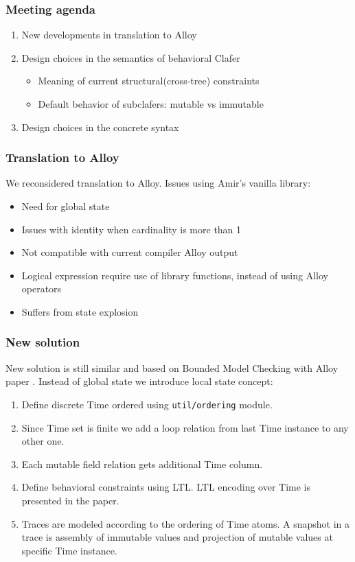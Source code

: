 \documentclass[xcolor=dvipsnames,12pt]{beamer}
\author{Paulius and Bogdan}
\date{May 29, 2013}
\newcommand\Fontvi{\fontsize{14}{14}\selectfont}
\begin{document}
  \begin{frame}
    \frametitle{Meeting agenda}
    \Fontvi
    \begin{enumerate}
      \item New developments in translation to Alloy
      \item Design choices in the semantics of behavioral Clafer
        \begin{itemize}
          \item Meaning of current structural(cross-tree) constraints
          \item Default behavior of subclafers: mutable vs immutable
        \end{itemize}
      \item{Design choices in the concrete syntax}
    \end{enumerate}
  \end{frame}

  \begin{frame}
    \frametitle{Translation to Alloy}
    We reconsidered translation to Alloy. Issues using Amir's vanilla library:
    \begin{itemize}
      \item{Need for global state}
      \item{Issues with identity when cardinality is more than 1}
      \item{Not compatible with current compiler Alloy output}
      \item{Logical expression require use of library functions, instead of using Alloy operators}
      \item{Suffers from state explosion}
    \end{itemize}

  \end{frame}

  \begin{frame}
    \frametitle{New solution}
    New solution is still similar and based on Bounded Model Checking with Alloy paper . Instead of global state we introduce local state concept:
    \begin{enumerate}
      \item{Define discrete Time ordered using \lstinline{util/ordering} module.}
      \item{Since Time set is finite we add a loop relation from last Time instance to any other one.}
      \item{Each mutable field relation gets additional Time column.}
      \item{Define behavioral constraints using LTL. LTL encoding over Time is presented in the paper.}
      \item{Traces are modeled according to the ordering of Time atoms. A snapshot in a trace is assembly of immutable values and projection of mutable values at specific Time instance.}
    \end{enumerate}
  \end{frame}
\end{document}

